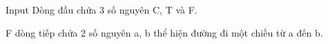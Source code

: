 Input
Dòng đầu chứa 3 số nguyên C, T và F.  

   F dòng tiếp chứa 2 số nguyên a, b thể hiện đường đi một chiều từ a đến b.